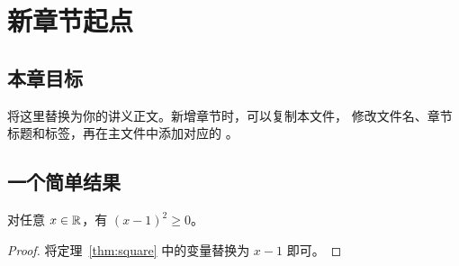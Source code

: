 \chapter{新章节起点}
\label{chap:new}

\section{本章目标}
将这里替换为你的讲义正文。新增章节时，可以复制本文件，
修改文件名、章节标题和标签，再在主文件中添加对应的
\verb||。

\section{一个简单结果}
\begin{theorem}
对任意 $x\in\mathbb{R}$，有 $(x-1)^2\geq 0$。
\end{theorem}
\begin{proof}
将定理~\ref{thm:square} 中的变量替换为 $x-1$ 即可。
\end{proof}
